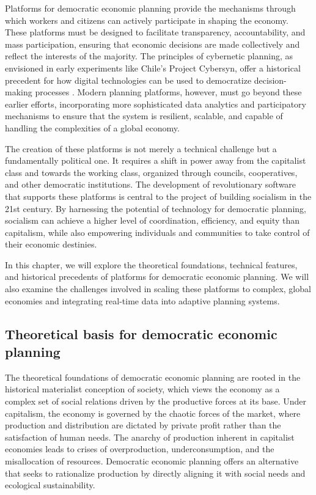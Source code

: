 \begin{refsection}
Platforms for democratic economic planning provide the mechanisms through which workers and citizens can actively participate in shaping the economy. These platforms must be designed to facilitate transparency, accountability, and mass participation, ensuring that economic decisions are made collectively and reflect the interests of the majority. The principles of cybernetic planning, as envisioned in early experiments like Chile’s Project Cybersyn, offer a historical precedent for how digital technologies can be used to democratize decision-making processes \cite[pp.~102-105]{medina2011cybersyn}. Modern planning platforms, however, must go beyond these earlier efforts, incorporating more sophisticated data analytics and participatory mechanisms to ensure that the system is resilient, scalable, and capable of handling the complexities of a global economy.

The creation of these platforms is not merely a technical challenge but a fundamentally political one. It requires a shift in power away from the capitalist class and towards the working class, organized through councils, cooperatives, and other democratic institutions. The development of revolutionary software that supports these platforms is central to the project of building socialism in the 21st century. By harnessing the potential of technology for democratic planning, socialism can achieve a higher level of coordination, efficiency, and equity than capitalism, while also empowering individuals and communities to take control of their economic destinies.

In this chapter, we will explore the theoretical foundations, technical features, and historical precedents of platforms for democratic economic planning. We will also examine the challenges involved in scaling these platforms to complex, global economies and integrating real-time data into adaptive planning systems.

\subsection{Theoretical basis for democratic economic planning}

The theoretical foundations of democratic economic planning are rooted in the historical materialist conception of society, which views the economy as a complex set of social relations driven by the productive forces at its base. Under capitalism, the economy is governed by the chaotic forces of the market, where production and distribution are dictated by private profit rather than the satisfaction of human needs. The anarchy of production inherent in capitalist economies leads to crises of overproduction, underconsumption, and the misallocation of resources. Democratic economic planning offers an alternative that seeks to rationalize production by directly aligning it with social needs and ecological sustainability.


\end{refsection}
